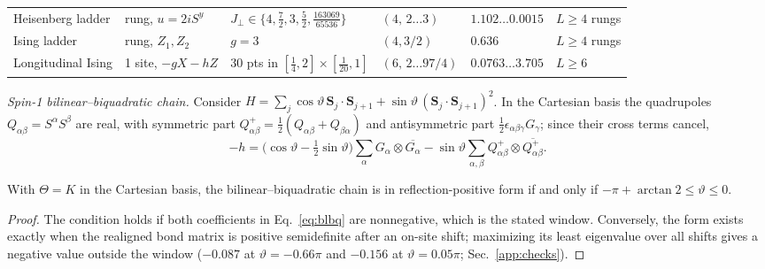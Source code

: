 \documentclass[aps,prl,reprint,amsmath,amssymb,nofootinbib,raggedbottom]{revtex4-2}
\begin{document}
\begin{table}[t]
\begin{ruledtabular}
\begin{tabular}{llllll}
Heisenberg ladder & rung, $u=2iS^y$ & $J_\perp\in\{4,\tfrac72,3,\tfrac52,\tfrac{163069}{65536}\}$ & $(4,\,2\dots3)$ & $1.102\dots0.0015$ & $L\ge4$ rungs \\
Ising ladder & rung, $Z_1,Z_2$ & $g=3$ & $(4,3/2)$ & $0.636$ & $L\ge4$ rungs \\
Longitudinal Ising & 1 site, $-gX-hZ$ & 30 pts in $[\tfrac14,2]{\times}[\tfrac1{20},1]$ & $(6,\,2\dots97/4)$ & $0.0763\dots3.705$ & $L\ge6$ \\
\end{tabular}
\end{ruledtabular}
\end{table}

\emph{Spin-1 bilinear--biquadratic chain.}
Consider $H=\sum_j\cos\vartheta\,\bm S_j\cdot\bm S_{j+1}
+\sin\vartheta\,(\bm S_j\cdot\bm S_{j+1})^2$. In the Cartesian basis the
quadrupoles $Q_{\alpha\beta}=S^\alpha S^\beta$ are real, with symmetric part
$Q^+_{\alpha\beta}=\frac12(Q_{\alpha\beta}+Q_{\beta\alpha})$ and antisymmetric
part $\frac12\epsilon_{\alpha\beta\gamma}G_\gamma$; since their cross terms
cancel,
\begin{equation}
 -h=\bigl(\cos\vartheta-\tfrac12\sin\vartheta\bigr)\sum_\alpha G_\alpha\otimes\overline{G_\alpha}
 -\sin\vartheta\sum_{\alpha,\beta}Q^{+}_{\alpha\beta}\otimes\overline{Q^{+}_{\alpha\beta}}.
 \label{eq:blbq}
\end{equation}
\begin{proposition}\label{prop:blbq}
With $\Theta=K$ in the Cartesian basis, the bilinear--biquadratic chain is
in reflection-positive form if and only if
$-\pi+\arctan2\le\vartheta\le0$.
\end{proposition}
\begin{proof}
The condition holds if both coefficients in Eq.~\eqref{eq:blbq} are
nonnegative, which is the stated window. Conversely, the form exists exactly
when the realigned bond matrix is positive semidefinite after an on-site
shift; maximizing its least eigenvalue over all shifts gives a negative value
outside the window ($-0.087$ at $\vartheta=-0.66\pi$ and $-0.156$ at
$\vartheta=0.05\pi$; Sec.~\ref{app:checks}).
\end{proof}
\end{document}

